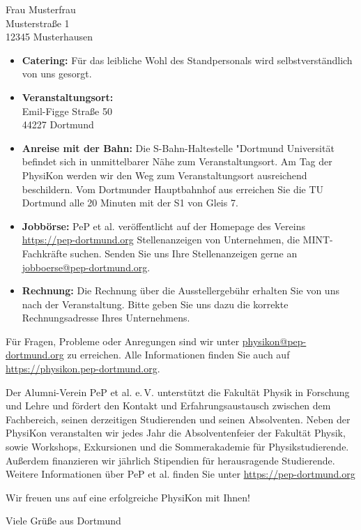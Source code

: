 \documentclass[
  pepbrief,
  fontsize=12pt,
  paper=a4,
  DIV=14,
  parskip=half,
  backaddress=false,
]{scrlttr2}
\begin{document}
\begin{letter}{%
  Frau Musterfrau \\
  Musterstraße 1 \\
  12345 Musterhausen
}
\begin{itemize}
  Für eine ausreichende Stromversorgung (500 Watt), sowie einen Internetzugang wird gesorgt.
  Wir bitten allerdings darum, keine allzu großen Verbraucher (zum Beispiel Beleuchtung für Roll-Up-Banner und Stellwände, etc.) mitzubringen.
  Aufgrund der begrenzten Fläche möchten wir Sie auch bitten keine großen Aufbauten für Ihren Stand mitzubringen.
  Roll-Up-Banner, Prospektständer, etc. sind natürlich kein Problem.
  Wir stellen Ihnen gerne Stellwände zur Verfügung, um Werbematerialien aufzuhängen.
  Größere Stellflächen sind aus organisatorischen Gründen leider nicht möglich.
  \item \textbf{Catering:} Für das leibliche Wohl des Standpersonals wird selbstverständlich von uns gesorgt.
  \item \textbf{Veranstaltungsort:}
  \vspace{3mm}\\
  Emil-Figge Straße 50\\
  44227 Dortmund
  \item \textbf{Anreise mit der Bahn:} Die S-Bahn-Haltestelle "Dortmund Universität befindet sich in unmittelbarer Nähe zum Veranstaltungsort.
  Am Tag der PhysiKon werden wir den Weg zum Veranstaltungsort ausreichend beschildern.
  Vom Dortmunder Hauptbahnhof aus erreichen Sie die TU Dortmund alle 20 Minuten mit der S1 von Gleis 7.
  \item \textbf{Jobbörse:} PeP et al. veröffentlicht auf der Homepage des Vereins \url{https://pep-dortmund.org} Stellenanzeigen von Unternehmen, die MINT-Fachkräfte suchen.
  Senden Sie uns Ihre Stellenanzeigen gerne an \href{mailto:jobboerse@pep-dortmund.org}{jobboerse@pep-dortmund.org}.
  \item \textbf{Rechnung:} Die Rechnung über die Ausstellergebühr erhalten Sie von uns nach der Veranstaltung.
  Bitte geben Sie uns dazu die korrekte Rechnungsadresse Ihres Unternehmens.
\end{itemize}

Für Fragen, Probleme oder Anregungen sind wir unter \href{mailto:physikon@pep-dortmund.org}{physikon@pep-dortmund.org} zu erreichen.
Alle Informationen finden Sie auch auf \url{https://physikon.pep-dortmund.org}.

Der Alumni-Verein PeP et al. e.\,V. unterstützt die Fakultät Physik in Forschung und Lehre und fördert den Kontakt und Erfahrungsaustausch zwischen dem Fachbereich,
seinen derzeitigen Studierenden und seinen Absolventen. Neben der PhysiKon veranstalten wir jedes Jahr die Absolventenfeier der Fakultät Physik, sowie Workshops, Exkursionen
und die Sommerakademie für Physikstudierende. Außerdem finanzieren wir jährlich Stipendien für herausragende Studierende. Weitere Informationen über PeP et al. finden Sie unter
\url{https://pep-dortmund.org}

Wir freuen uns auf eine erfolgreiche PhysiKon mit Ihnen!

\closing{Viele Grüße aus Dortmund}

\end{letter}
\end{document}
